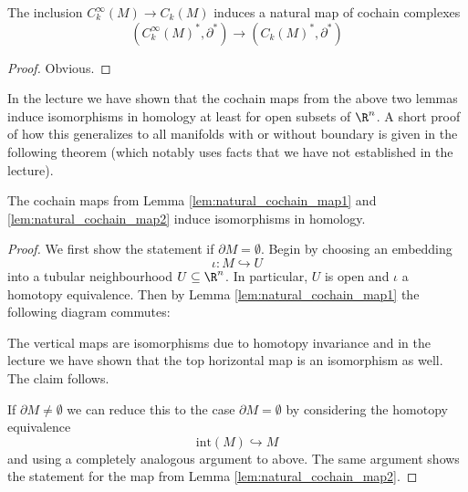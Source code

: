         \begin{lemma}
            \label{lem:natural_cochain_map2}
            The inclusion $C_k^\infty(M) \to C_k(M)$ induces a natural map of cochain complexes
            \[
                (C_k^\infty(M)^\ast,\partial^\ast) \to (C_k(M)^\ast,\partial^\ast)
            \]
        \end{lemma}
        \begin{proof}
            Obvious.
        \end{proof}

        In the lecture we have shown that the cochain maps from the above two lemmas induce isomorphisms in homology at least for open subsets of $\R^n$. A short proof of how this generalizes to all manifolds with or without boundary is given in the following theorem (which notably uses facts that we have not established in the lecture).

        \begin{theorem}
            The cochain maps from Lemma \ref{lem:natural_cochain_map1} and \ref{lem:natural_cochain_map2} induce isomorphisms in homology.
        \end{theorem}
        \begin{proof}
            We first show the statement if $\partial M = \emptyset$. Begin by choosing an embedding
            \[
            \iota \colon M \hookrightarrow U
            \]
            into a tubular neighbourhood $U \subseteq \R^n$. In particular, $U$ is open and $\iota$ a homotopy equivalence. Then by Lemma \ref{lem:natural_cochain_map1} the following diagram commutes:
            \begin{center}
            \end{center}
            The vertical maps are isomorphisms due to homotopy invariance and in the lecture we have shown that the top horizontal map is an isomorphism as well. The claim follows. 
            
            If $\partial M \neq \emptyset$ we can reduce this to the case $\partial M = \emptyset$ by considering the homotopy equivalence
            \[
            \mathrm{int}(M) \hookrightarrow M
            \]
            and using a completely analogous argument to above. The same argument shows the statement for the map from Lemma \ref{lem:natural_cochain_map2}.
        \end{proof}


